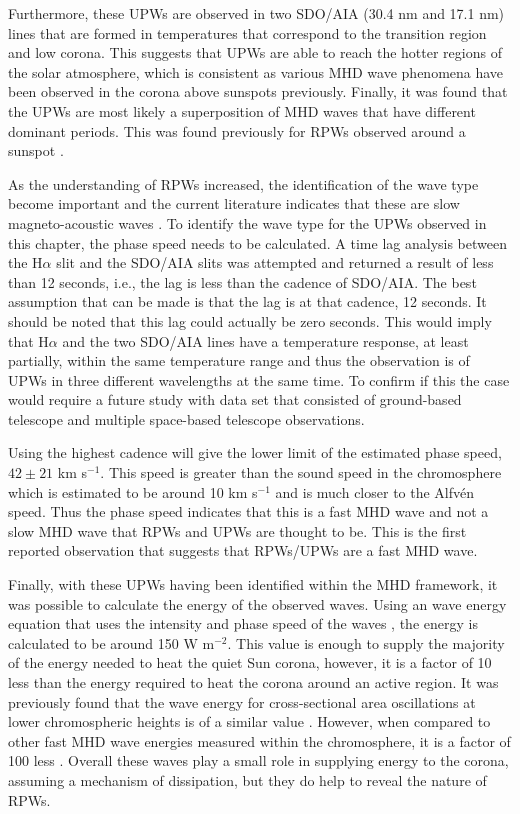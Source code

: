 	Furthermore, these UPWs are observed in two SDO/AIA (30.4 nm and 17.1 nm) lines that are formed in temperatures that correspond to the transition region and low corona.
	This suggests that UPWs are able to reach the hotter regions of the solar atmosphere, which is consistent as various MHD wave phenomena have been observed in the corona above sunspots previously. 
	Finally, it was found that the UPWs are most likely a superposition of MHD waves that have different dominant periods.
	This was found previously for RPWs observed around a sunspot \citep{Jess2013}. 
	
	As the understanding of RPWs increased, the identification of the wave type become important and the current literature indicates that these are slow magneto-acoustic waves \citep{Bloomfiel2008}.
	To identify the wave type for the UPWs observed in this chapter, the phase speed needs to be calculated.
	A time lag analysis between the H$\alpha$ slit and the SDO/AIA slits was attempted and returned a result of less than 12 seconds, i.e., the lag is less than the cadence of SDO/AIA.
	The best assumption that can be made is that the lag is at that cadence, 12 seconds.
	It should be noted that this lag could actually be zero seconds. 
	This would imply that H$\alpha$ and the two SDO/AIA lines have a temperature response, at least partially, within the same temperature range and thus the observation is of UPWs in three different wavelengths at the same time. 
	To confirm if this the case would require a future study with data set that consisted of ground-based telescope and multiple space-based telescope observations.
	
	Using the highest cadence will give the lower limit of the estimated phase speed, $42\pm21$ km s$^{-1}$.
	This speed is greater than the sound speed in the chromosphere which is estimated to be around 10 km s$^{-1}$ \citep{Morton2012} and is much closer to the Alfv\'en speed.
	Thus the phase speed indicates that this is a fast MHD wave and not a slow MHD wave that RPWs and UPWs are thought to be.
    This is the first reported observation that suggests that RPWs/UPWs are a fast MHD wave.
    
    Finally, with these UPWs having been identified within the MHD framework, it was possible to calculate the energy of the observed waves.
    Using an wave energy equation that uses the intensity and phase speed of the waves \citep{Kitagawa2010}, the energy is calculated to be around 150 W m$^{-2}$.
    This value is enough to supply the majority of the energy needed to heat the quiet Sun corona, however, it is a factor of 10 less than the energy required to heat the corona around an active region.
    It was previously found that the wave energy for cross-sectional area oscillations at lower chromospheric heights is of a similar value  \citep{0004-637X-806-1-132}. 
    However, when compared to other fast MHD wave energies measured within the chromosphere, it is a factor of 100 less \citep{Morton2012}. 
    Overall these waves play a small role in supplying energy to the corona, assuming a mechanism of dissipation, but they do help to reveal the nature of RPWs.
    

